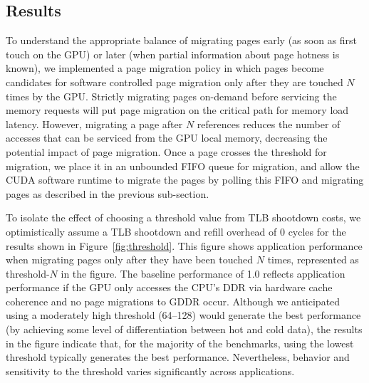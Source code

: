 \subsection{Results}
\label{thresholdresults}
{\color{black}To understand the appropriate balance of migrating pages early (as soon as first touch on the GPU) or later (when partial information about page hotness is known),
we implemented a page migration policy in which pages become candidates for software controlled page migration only after they are touched
$N$ times by the GPU\@. Strictly migrating pages on-demand before servicing the memory requests will put 
page migration on the critical path for memory load latency. However, migrating a page after
$N$ references reduces the number of accesses that can be serviced from the GPU local memory, decreasing the potential
impact of page migration.} Once a page crosses the threshold for migration, we place it in an unbounded FIFO queue for migration, and allow
the CUDA software runtime to migrate the pages by polling this FIFO and migrating pages as described
in the previous sub-section.  

To isolate the effect of choosing a threshold value from TLB shootdown costs, we optimistically assume a TLB shootdown 
and refill overhead of 0 cycles for the results shown in Figure~\ref{fig:threshold}. This figure shows application
performance when migrating pages only after they have been touched $N$ times,
represented as threshold-$N$ in the figure.   The baseline
performance of 1.0 reflects application performance if the GPU only accesses the CPU's DDR via hardware cache coherence and no page migrations
to GDDR occur.  Although we anticipated using a moderately high threshold (64--128) would generate the best performance
(by achieving some level of differentiation between hot and cold data), the results in the figure indicate that, for the majority of the benchmarks, using the lowest threshold 
typically generates the best performance.  Nevertheless, behavior and sensitivity to the threshold varies significantly across applications.

